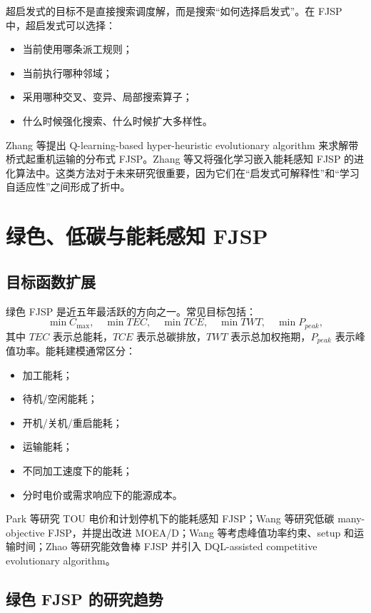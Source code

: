 \documentclass[UTF8,a4paper,11pt]{ctexart}
\newcommand{\Cmax}{C_{\max}}
\begin{document}
超启发式的目标不是直接搜索调度解，而是搜索“如何选择启发式”。在 FJSP 中，超启发式可以选择：
\begin{itemize}
    \item 当前使用哪条派工规则；
    \item 当前执行哪种邻域；
    \item 采用哪种交叉、变异、局部搜索算子；
    \item 什么时候强化搜索、什么时候扩大多样性。
\end{itemize}

Zhang 等提出 Q-learning-based hyper-heuristic evolutionary algorithm 来求解带桥式起重机运输的分布式 FJSP\cite{Zhang2023CraneQL}。Zhang 等又将强化学习嵌入能耗感知 FJSP 的进化算法中\cite{Zhang2024EATA}。这类方法对于未来研究很重要，因为它们在“启发式可解释性”和“学习自适应性”之间形成了折中。

\section{绿色、低碳与能耗感知 FJSP}

\subsection{目标函数扩展}

绿色 FJSP 是近五年最活跃的方向之一。常见目标包括：
\[
\min \Cmax,\quad \min TEC,\quad \min TCE,\quad \min TWT,\quad \min P_{peak},
\]
其中 $TEC$ 表示总能耗，$TCE$ 表示总碳排放，$TWT$ 表示总加权拖期，$P_{peak}$ 表示峰值功率。能耗建模通常区分：
\begin{itemize}
    \item 加工能耗；
    \item 待机/空闲能耗；
    \item 开机/关机/重启能耗；
    \item 运输能耗；
    \item 不同加工速度下的能耗；
    \item 分时电价或需求响应下的能源成本。
\end{itemize}

Park 等研究 TOU 电价和计划停机下的能耗感知 FJSP\cite{Park2022TOU}；Wang 等研究低碳 many-objective FJSP，并提出改进 MOEA/D\cite{Wang2024MOEAD}；Wang 等考虑峰值功率约束、setup 和运输时间\cite{Wang2024PeakPower}；Zhao 等研究能效鲁棒 FJSP 并引入 DQL-assisted competitive evolutionary algorithm\cite{Zhao2024ERFJSP}。

\subsection{绿色 FJSP 的研究趋势}
\end{document}
